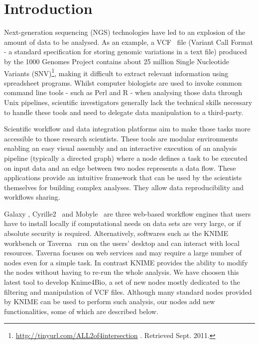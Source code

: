 \documentclass{bioinfo}
\begin{document}
\section{Introduction}

Next-generation sequencing (NGS) technologies have led to an explosion of the amount of data to be analysed. As an example, a VCF~\citep{pmid21653522} file (Variant Call Format - a standard specification for storing genomic variations in a text file) produced by the 1000 Genomes Project contains about 25 million Single Nucleotide Variants (SNV)\footnote{\href{ftp://ftp-trace.ncbi.nih.gov/1000genomes/ftp/release/20100804/ALL.2of4intersection.20100804.sites.vcf.gz}{http://tinyurl.com/ALL2of4intersection} . Retrieved Sept. 2011.}, making it difficult to extract relevant information using spreadsheet programs. Whilst computer biologists are used to invoke common command line tools - such as Perl and R - when analysing those data through Unix pipelines, scientific investigators generally lack the technical skills necessary to handle these tools and need to delegate data manipulation to a third-party. 

Scientific workflow and data integration platforms aim to make those tasks more accessible to those research scientists. These tools are modular environments enabling an easy visual assembly and an interactive execution of an analysis pipeline (typically a directed graph) where a node defines a task to be executed on input data and an edge between two nodes represents a data flow. These applications provide an intuitive framework that can be used by the scientists themselves for building complex analyses. They allow data reproducibility and workflows sharing.

Galaxy \citep{pmid21531983}, Cyrille2~\citep{pmid18269742} and Mobyle~\citep{pmid19689959} are three web-based workflow engines that users have to install locally if computational needs on data sets are very large, or if absolute security is required. Alternatively, softwares such as the KNIME~\citep{knimeref} workbench or Taverna~\citep{pmid16845108}  run on the users' desktop and can interact with local resources. Taverna focuses on web services and may require a large number of nodes even for a simple task. In contrast KNIME provides the ability to modify the nodes without having to re-run the whole analysis. We have choosen this latest tool to develop Knime4Bio, a set of new nodes mostly dedicated to the filtering and manipulation of VCF files. Although many standard nodes provided by KNIME can be used to perform such analysis, our nodes add new functionalities, some of which are described below.
\end{document}
